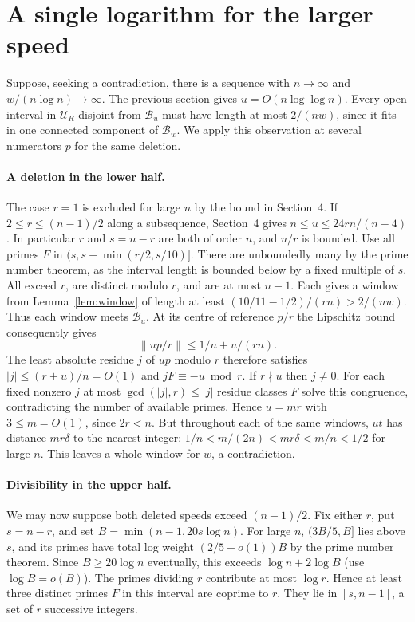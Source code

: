 \documentclass[11pt,a4paper]{article}
\newcommand{\dist}[1]{\lVert #1\rVert}
\newcommand{\bad}{\mathcal B}
\newcommand{\good}{\mathcal U}
\begin{document}
\newpage
\section{A single logarithm for the larger speed}
Suppose, seeking a contradiction, there is a sequence with $n\to\infty$
and $w/(n\log n)\to\infty$. The previous section gives $u=O(n\log\log n)$.
Every open interval in $\good_R$ disjoint from $\bad_u$ must have length
at most $2/(nw)$, since it fits in one connected component of $\bad_w$.
We apply this observation at several numerators $p$ for the same deletion.

\paragraph{A deletion in the lower half.}
The case $r=1$ is excluded for large $n$ by the bound in Section~4.
If $2\le r\le(n-1)/2$ along a subsequence, Section~4 gives
$n\le u\le24rn/(n-4)$. In particular $r$ and $s=n-r$ are both of order
$n$, and $u/r$ is bounded. Use all primes $F$ in
$(s,s+\min(r/2,s/10)]$. There are unboundedly many by the prime number
theorem, as the interval length is bounded below by a fixed multiple
of $s$. All exceed $r$, are distinct modulo $r$, and are at most $n-1$.
Each gives a window from Lemma~\ref{lem:window} of length at least
$(10/11-1/2)/(rn)>2/(nw)$. Thus each window meets $\bad_u$.
At its centre of reference $p/r$ the Lipschitz bound consequently gives
\[
 \dist{up/r}\le 1/n+u/(rn).
\]
The least absolute residue $j$ of $up$ modulo $r$ therefore satisfies
$|j|\le (r+u)/n=O(1)$ and $jF\equiv-u\bmod r$. If $r\nmid u$ then
$j\ne0$. For each fixed nonzero $j$ at most $\gcd(|j|,r)\le|j|$
residue classes $F$ solve this congruence, contradicting the number
of available primes. Hence $u=mr$ with $3\le m=O(1)$, since $2r<n$.
But throughout each of the same windows, $ut$ has distance
$mr\delta$ to the nearest integer: $1/n<m/(2n)<mr\delta<m/n<1/2$
for large $n$. This leaves a whole window for $w$, a contradiction.

\paragraph{Divisibility in the upper half.}
We may now suppose both deleted speeds exceed $(n-1)/2$. Fix either
$r$, put $s=n-r$, and set $B=\min(n-1,20s\log n)$. For large $n$,
$(3B/5,B]$ lies above $s$, and its primes have total log weight
$(2/5+o(1))B$ by the prime number theorem. Since $B\ge20\log n$
eventually, this exceeds $\log n+2\log B$ (use $\log B=o(B)$).
The primes dividing $r$ contribute at most $\log r$. Hence at least
three distinct primes $F$ in this interval are coprime to $r$. They lie
in $[s,n-1]$, a set of $r$ successive integers.
\end{document}
